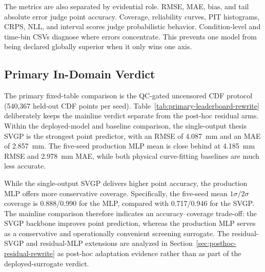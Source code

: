 The metrics are also separated by evidential role. RMSE, MAE, bias, and tail
absolute error judge point accuracy. Coverage, reliability curves, PIT
histograms, CRPS, NLL, and interval scores judge probabilistic behavior.
Condition-level and time-bin CSVs diagnose where errors concentrate. This
prevents one model from being declared globally superior when it only wins one
axis.

\subsection{Primary In-Domain Verdict}
\label{sec:primary-in-domain-verdict}
\label{sec:in-domain-accuracy-en}
\label{sec:in-domain-accuracy-zh}

The primary fixed-table comparison is the QC-gated uncensored CDF protocol
(540{,}367 held-out CDF points per seed).
Table~\ref{tab:primary-leaderboard-rewrite} deliberately keeps the mainline
verdict separate from the post-hoc residual arms. Within the deployed-model and
baseline comparison, the single-output thesis SVGP is the strongest point
predictor, with an RMSE of \SI{4.087}{mm} and an MAE of \SI{2.857}{mm}. The
five-seed production MLP mean is close behind at \SI{4.185}{mm} RMSE and
\SI{2.978}{mm} MAE, while both physical curve-fitting baselines are much less
accurate.

While the single-output SVGP delivers higher point accuracy, the production
MLP offers more conservative coverage. Specifically, the five-seed mean
\(1\sigma/2\sigma\) coverage is 0.888/0.990 for the MLP, compared with
0.717/0.946 for the SVGP. The mainline comparison therefore indicates an
accuracy--coverage trade-off: the SVGP backbone improves point prediction,
whereas the production MLP serves as a conservative and operationally
convenient screening surrogate. The residual-SVGP and residual-MLP extensions
are analyzed in Section~\ref{sec:posthoc-residual-rewrite} as post-hoc
adaptation evidence rather than as part of the deployed-surrogate verdict.

